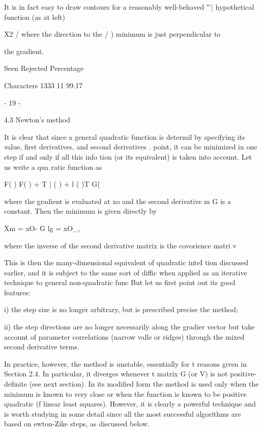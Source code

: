      It is in fact easy to draw contours for a reasonably well-behaved
                    "'|           hypothetical function (as at left)
 
 X2               / where the direction to the
                /  ) minimum is just perpendicular to
 
                                      the gradient.
 
                 Seen Rejected  Percentage
 
Characters       1333       11   99.17
 
                            - 19 -
 
 
4.3  Newton's method
 
     It is clear that since a general quadratic function is determil
by specifying its value, first derivatives, and second derivatives .
point, it can be minimized in one step if and only if all this info
tion (or its equivalent) is taken into account.  Let us write a qua
ratic function as
 
              F( )   F(  ) +  T | (    ) + l (    )T G(
 
 
 
where the gradient  is evaluated at xo and the second derivative m
G is a constant.  Then the minimum is given directly by
 
 
                     Xm = xO- G lg = xO_,
 
where the inverse of the second derivative matrix is the covorience
matri v
 
     This is then the many-dimensional equivalent of quadratic inteI
tion discussed earlier, and it is subject to the same sort of diffic
when applied as an iterative technique to general non-quadratic func
But let us first point out its good features:
 
  i) the step size is no longer arbitrary, but is prescribed precise
     the method;
 
 ii) the step directions are no longer necessarily along the gradier
     vector but take account of parameter correlations (narrow valle
     or ridges) through the mixed second derivative terms.
 
     In practice, however, the method is unstable, essentially for t
reasons given in Section 2.4.  In particular, it diverges whenever t
matrix G (or V) is not positive-definite (see next section).  In its
modified form  the method is used only when the minimum is known to
very close or when the function is known to be positive quadratic (f
linear least squares).  However, it is clearly a powerful technique
and is worth studying in some detail since all the most successful
algorithms are based on ewton-Zike steps, as discussed below.
 
